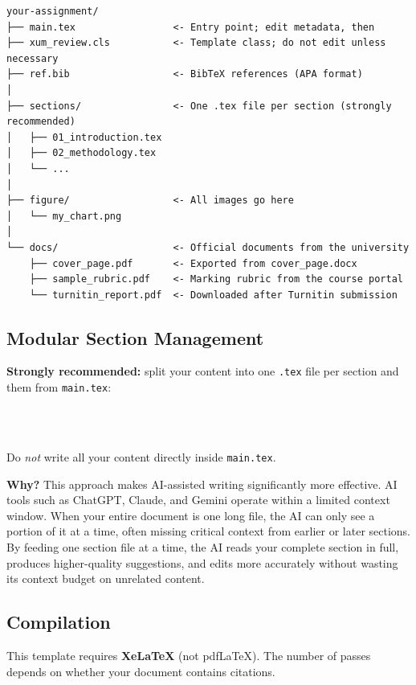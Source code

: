 \begin{verbatim}
your-assignment/
├── main.tex                 <- Entry point; edit metadata, then 
├── xum_review.cls           <- Template class; do not edit unless necessary
├── ref.bib                  <- BibTeX references (APA format)
│
├── sections/                <- One .tex file per section (strongly recommended)
│   ├── 01_introduction.tex
│   ├── 02_methodology.tex
│   └── ...
│
├── figure/                  <- All images go here
│   └── my_chart.png
│
└── docs/                    <- Official documents from the university
    ├── cover_page.pdf       <- Exported from cover_page.docx
    ├── sample_rubric.pdf    <- Marking rubric from the course portal
    └── turnitin_report.pdf  <- Downloaded after Turnitin submission
\end{verbatim}

\subsection{Modular Section Management}

\textbf{Strongly recommended:} split your content into one \texttt{.tex} file
per section and \verb|| them from \texttt{main.tex}:

\begin{verbatim}



\end{verbatim}

Do \emph{not} write all your content directly inside \texttt{main.tex}.

\textbf{Why?} This approach makes AI-assisted writing significantly more
effective.
AI tools such as ChatGPT, Claude, and Gemini operate within a limited
context window.
When your entire document is one long file, the AI can only see a portion of
it at a time, often missing critical context from earlier or later sections.
By feeding one section file at a time, the AI reads your complete section in
full, produces higher-quality suggestions, and edits more accurately without
wasting its context budget on unrelated content.

\subsection{Compilation}

This template requires \textbf{XeLaTeX} (not pdfLaTeX).
The number of passes depends on whether your document contains citations.

